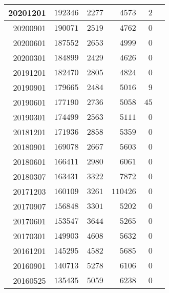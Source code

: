\documentclass[hidelinks,a4paper,12pt]{article}
\begin{document}
\begin{center}
\begin{tabular}{|r|r|r|r|r|r|}
20201201         & $192346$         & $2277$         & $4573$           & $2$              \\ \hline
20200901         & $190071$         & $2519$         & $4762$           & $0$              \\ \hline
20200601         & $187552$         & $2653$         & $4999$           & $0$              \\ \hline
20200301         & $184899$         & $2429$         & $4626$           & $0$              \\ \hline
20191201         & $182470$         & $2805$         & $4824$           & $0$              \\ \hline
20190901         & $179665$         & $2484$         & $5016$           & $9$              \\ \hline
20190601         & $177190$         & $2736$         & $5058$           & $45$             \\ \hline
20190301         & $174499$         & $2563$         & $5111$           & $0$              \\ \hline
20181201         & $171936$         & $2858$         & $5359$           & $0$              \\ \hline
20180901         & $169078$         & $2667$         & $5603$           & $0$              \\ \hline
20180601         & $166411$         & $2980$         & $6061$           & $0$              \\ \hline
20180307         & $163431$         & $3322$         & $7872$           & $0$              \\ \hline
20171203         & $160109$         & $3261$         & $110426$         & $0$              \\ \hline
20170907         & $156848$         & $3301$         & $5202$           & $0$              \\ \hline
20170601         & $153547$         & $3644$         & $5265$           & $0$              \\ \hline
20170301         & $149903$         & $4608$         & $5632$           & $0$              \\ \hline
20161201         & $145295$         & $4582$         & $5685$           & $0$              \\ \hline
20160901         & $140713$         & $5278$         & $6106$           & $0$              \\ \hline
20160525         & $135435$         & $5059$         & $6238$           & $0$              \\ \hline

\end{tabular}
\end{center}
\end{document}
